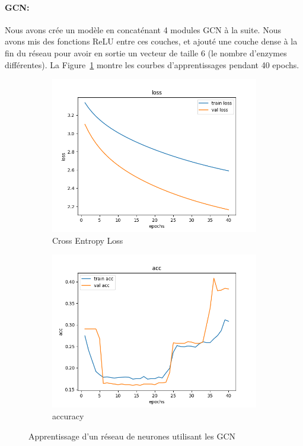 \documentclass[a4paper]{article}
\begin{document}
\paragraph{GCN:}
Nous avons crée un modèle en concaténant 4 modules GCN à la suite. Nous avons mis des fonctions ReLU entre ces couches, et 
ajouté une couche dense à la fin du réseau pour avoir en sortie un vecteur de taille 6 (le nombre d'enzymes différentes). La 
Figure~\ref{fig: GCN} montre les courbes d'apprentissages pendant 40 epochs.

\begin{figure}[ht]
    \centering
    \begin{subfigure}{0.47\textwidth}
      \includegraphics[width=\linewidth]{../results/GCN_0/loss.png}
      \caption{Cross Entropy Loss}
    \end{subfigure}
    \hfill
    \begin{subfigure}{0.47\textwidth}
      \includegraphics[width=\linewidth]{../results/GCN_0/acc.png}
      \caption{accuracy}
    \end{subfigure}
    \caption{Apprentissage d'un réseau de neurones utilisant les GCN}
    \label{fig: GCN}
\end{figure}
\end{document}
